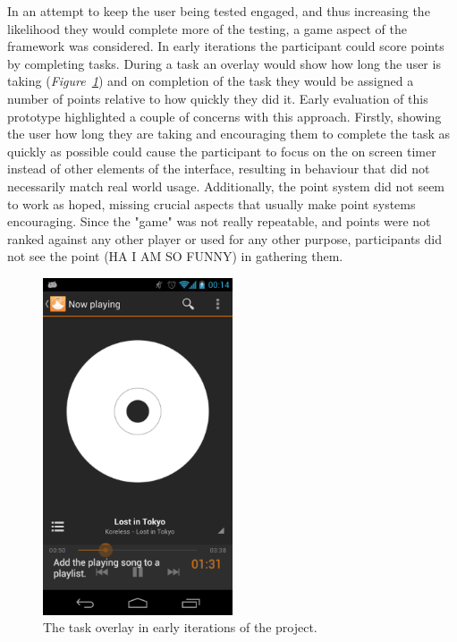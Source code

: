 In an attempt to keep the user being tested engaged, and thus increasing the likelihood they would complete more of the testing, a game aspect of the framework was considered. In early
iterations the participant could score points by completing tasks. During a task an overlay would show how long the user is taking (\emph{Figure~\ref{fig:initial-overlay}}) and on completion of the task
they would be assigned a number of points relative to how quickly they did it.
Early evaluation of this prototype highlighted a couple of concerns with this approach. Firstly, showing the user how
long they are taking and encouraging them to complete the task as quickly as
possible could cause the participant to focus on the on screen timer instead of other elements of the interface, resulting in behaviour that did not necessarily match real world usage.
Additionally, the point system did not seem to work as hoped, missing crucial aspects that usually make point systems encouraging.  Since the "game" was not really repeatable, and points were not ranked against any other player or used for any other purpose, participants did not see the point (HA I AM SO FUNNY) in gathering them. 

\begin{figure}[ht!]
  \centering \includegraphics[width=0.5\textwidth]{images/time-taken}
  \caption{The task overlay in early iterations of the project.}
  \label{fig:initial-overlay}
\end{figure}

